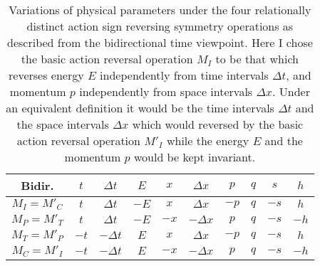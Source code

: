 \documentclass[notitlepage,12pt]{report}
\begin{document}
\begin{table}
\begin{center}
\begin{tabular}{c||c|c|c||c|c|c||c|c|c}
Bidir. & $t$  & $\Delta t$  & $E$ & $x$ & $\Delta x$ & $p$ & $q$ & $s$ & $h$ \\  \hline\hline
$M_I=M'_C$ & $t$  & $\Delta t$  & $-E$ & $x$ & $\Delta x$ & $-p$ & $q$ & $-s$ & $h$ \\  \hline
$M_P=M'_T$ & $t$  & $\Delta t$  & $-E$ & $-x$ & $-\Delta x$ & $p$ & $q$ & $-s$ & $-h$ \\  \hline
$M_T=M'_P$ & $-t$ & $-\Delta t$  & $E$ & $x$ & $\Delta x$ & $-p$ & $q$ & $-s$ & $h$  \\  \hline
$M_C=M'_I$ & $-t$ & $-\Delta t$  & $E$ & $-x$ & $-\Delta x$ & $p$ & $q$ & $-s$ & $-h$  
\end{tabular}
\end{center}
\caption[Variations of physical parameters under the four relationally distinct action sign reversing symmetry operations as described from the bidirectional time viewpoint]{Variations of physical parameters under the four relationally distinct action sign reversing symmetry operations as described from the bidirectional time viewpoint. Here I chose the basic action reversal operation $M_I$ to be that which reverses energy $E$ independently from time intervals $\Delta t$, and momentum $p$ independently from space intervals $\Delta x$. Under an equivalent definition it would be the time intervals $\Delta t$ and the space intervals $\Delta x$ which would reversed by the basic action reversal operation $M'_I$ while the energy $E$ and the momentum $p$ would be kept invariant.}\label{tab:3.5}
\end{table}
\end{document}

